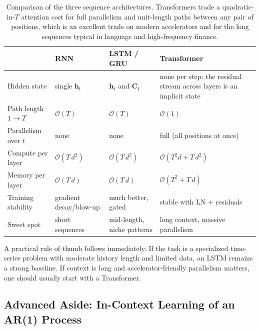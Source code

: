 \documentclass[11pt,a4paper]{report}
\newcommand{\h}{\bm{h}}
\begin{document}
\begin{table}[ht]
\centering
\small
\setlength{\tabcolsep}{5pt}
\renewcommand{\arraystretch}{1.15}
\begin{tabular}{@{}l
  >{\centering\arraybackslash}p{2.6cm}
  >{\centering\arraybackslash}p{3.0cm}
  >{\centering\arraybackslash}p{4.2cm}@{}}
\toprule
& \textbf{RNN} & \textbf{LSTM / GRU} & \textbf{Transformer} \\
\midrule
Hidden state                 & single $\h_t$         & $\h_t$ and $\bm{C}_t$       & none per step; the residual stream across layers is an implicit state \\
Path length $1 \to T$        & $\mathcal{O}(T)$      & $\mathcal{O}(T)$            & $\mathcal{O}(1)$ \\
Parallelism over $t$         & none                  & none                        & full (all positions at once) \\
Compute per layer            & $\mathcal{O}(T\,d^2)$ & $\mathcal{O}(T\,d^2)$       & $\mathcal{O}(T^2 d + T\,d^2)$ \\
Memory per layer             & $\mathcal{O}(T\,d)$   & $\mathcal{O}(T\,d)$         & $\mathcal{O}(T^2 + T\,d)$ \\
Training stability           & gradient decay/blow-up & much better, gated         & stable with LN + residuals \\
Sweet spot                   & short sequences       & mid-length, niche patterns  & long context, massive parallelism \\
\bottomrule
\end{tabular}
\caption{Comparison of the three sequence architectures.  Transformers trade a quadratic-in-$T$ attention cost for full parallelism and unit-length paths between any pair of positions, which is an excellent trade on modern accelerators and for the long sequences typical in language and high-frequency finance.}
\label{tab:seq_compare}
\end{table}

A practical rule of thumb follows immediately.  If the task is a specialized time-series problem with moderate history length and limited data, an LSTM remains a strong baseline.  If context is long and accelerator-friendly parallelism matters, one should usually start with a Transformer.

\subsection{Advanced Aside: In-Context Learning of an AR(1) Process}
\label{sec:incontext_ar1}
\end{document}
